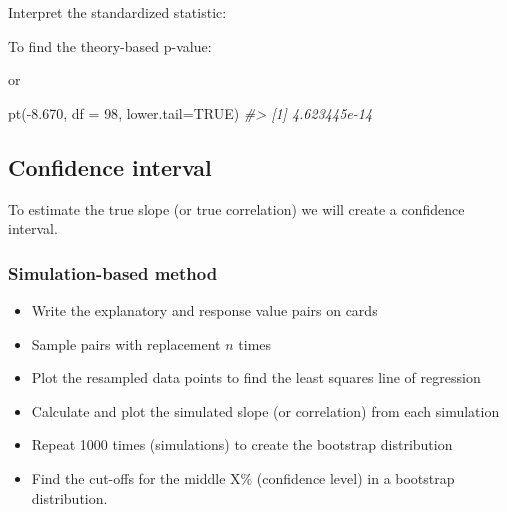 \documentclass[
]{report}
\newenvironment{Shaded}{\begin{snugshade}}{\end{snugshade}}
\newcommand{\AttributeTok}[1]{\textcolor[rgb]{0.77,0.63,0.00}{#1}}
\newcommand{\CommentTok}[1]{\textcolor[rgb]{0.56,0.35,0.01}{\textit{#1}}}
\newcommand{\ConstantTok}[1]{\textcolor[rgb]{0.00,0.00,0.00}{#1}}
\newcommand{\DecValTok}[1]{\textcolor[rgb]{0.00,0.00,0.81}{#1}}
\newcommand{\FloatTok}[1]{\textcolor[rgb]{0.00,0.00,0.81}{#1}}
\newcommand{\FunctionTok}[1]{\textcolor[rgb]{0.00,0.00,0.00}{#1}}
\newcommand{\NormalTok}[1]{#1}
\newcommand{\OtherTok}[1]{\textcolor[rgb]{0.56,0.35,0.01}{#1}}
\newcommand{\SpecialCharTok}[1]{\textcolor[rgb]{0.00,0.00,0.00}{#1}}
\begin{document}
Interpret the standardized statistic:

\vspace{0.8in}

To find the theory-based p-value:

\begin{Shaded}
\end{Shaded}

or

\begin{Shaded}
\begin{Highlighting}[]
\FunctionTok{pt}\NormalTok{(}\SpecialCharTok{{-}}\FloatTok{8.670}\NormalTok{, }\AttributeTok{df =} \DecValTok{98}\NormalTok{, }\AttributeTok{lower.tail=}\ConstantTok{TRUE}\NormalTok{)}
\CommentTok{\#\textgreater{} [1] 4.623445e{-}14}
\end{Highlighting}
\end{Shaded}

\hypertarget{confidence-interval-7}{%
\subsection*{Confidence interval}\label{confidence-interval-7}}

To estimate the true slope (or true correlation) we will create a confidence interval.

\hypertarget{simulation-based-method-8}{%
\subsubsection*{Simulation-based method}\label{simulation-based-method-8}}

\begin{itemize}
\item
  Write the explanatory and response value pairs on cards
\item
  Sample pairs with replacement \(n\) times
\item
  Plot the resampled data points to find the least squares line of regression
\item
  Calculate and plot the simulated slope (or correlation) from each simulation
\item
  Repeat 1000 times (simulations) to create the bootstrap distribution
\item
  Find the cut-offs for the middle X\% (confidence level) in a bootstrap distribution.
\end{itemize}
\end{document}
